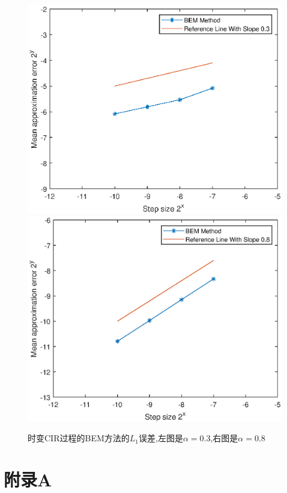 \documentclass[12pt,final]{article}
\theoremstyle{plain}
\theoremstyle{Definition}
\theoremstyle{Remark}
\begin{document}
	\begin{figure}[htp!]
		\centering
		\includegraphics[width=0.45\linewidth]{BEMalpha=0.3.eps}
		\hfill
		\includegraphics[width=0.45\linewidth]{BEMalpha=0.8.eps}
		\caption{时变CIR过程的BEM方法的$L_1$误差,左图是$\alpha=0.3$,右图是$\alpha=0.8$}
		\label{fig:image}
		\vspace{-2ex}
	\end{figure}
	
	\appendix
	\renewcommand{\appendixname}{附录} %
	
	\section{附录A}\label{appendix A}
	
	
	
	
	
	
	
	
	
\end{document}
